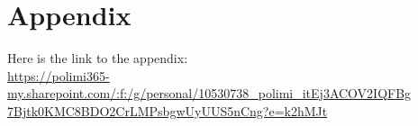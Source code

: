 \documentclass{Configuration_Files/PoliMi3i_thesis}
\begin{document}
\cleardoublepage
{} %
\appendix
\chapter{Appendix}

Here is the link to the appendix: \\
  \url{https://polimi365-my.sharepoint.com/:f:/g/personal/10530738_polimi_itEj3ACOV2IQFBg} \\ \url{7Bjtk0KMC8BDO2CrLMPsbgwUyUUS5nCng?e=k2hMJt}

\listoffigures


\cleardoublepage
\end{document}
